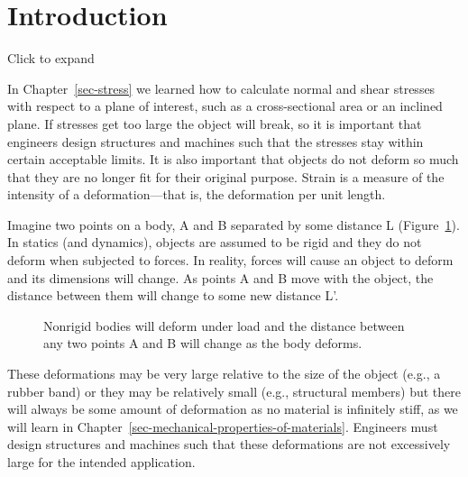 \documentclass[
  letterpaper,
  DIV=11,
  numbers=noendperiod]{scrreprt}
\theoremstyle{definition}
\theoremstyle{remark}
\begin{document}
\section*{Introduction}\label{introduction-2}


Click to expand

In Chapter~\ref{sec-stress} we learned how to calculate normal and shear
stresses with respect to a plane of interest, such as a cross-sectional
area or an inclined plane. If stresses get too large the object will
break, so it is important that engineers design structures and machines
such that the stresses stay within certain acceptable limits. It is also
important that objects do not deform so much that they are no longer fit
for their original purpose. Strain is a measure of the intensity of a
deformation---that is, the deformation per unit length.

Imagine two points on a body, A and B separated by some distance L
(Figure~\ref{fig-3.1}). In statics (and dynamics), objects are assumed
to be rigid and they do not deform when subjected to forces. In reality,
forces will cause an object to deform and its dimensions will change. As
points A and B move with the object, the distance between them will
change to some new distance L'.

\begin{figure}


\caption{\label{fig-3.1}Nonrigid bodies will deform under load and the
distance between any two points A and B will change as the body
deforms.}

\end{figure}%

These deformations may be very large relative to the size of the object
(e.g., a rubber band) or they may be relatively small (e.g., structural
members) but there will always be some amount of deformation as no
material is infinitely stiff, as we will learn in
Chapter~\ref{sec-mechanical-properties-of-materials}. Engineers must
design structures and machines such that these deformations are not
excessively large for the intended application.
\end{document}
